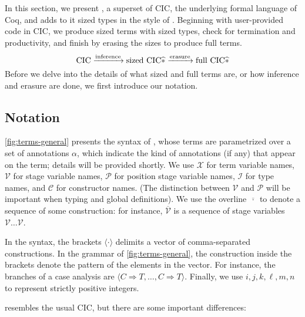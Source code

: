 \documentclass[nonacm,screen,10pt]{acmart}
\begin{document}
\section{\texorpdfstring{\lang}{CIC\^{}*}}\label{sec:typing}
In this section, we present \lang, a superset of CIC, the underlying formal language of Coq, and adds to it sized types in the style of \CIChat. Beginning with user-provided code in CIC, we produce sized \lang terms with sized types, check for termination and productivity, and finish by erasing the sizes to produce full \lang terms.
\begin{equation*}
    \text{CIC} \xrightarrow{\text{inference}} \text{sized CIC$\widehat{*}$} \xrightarrow{\text{erasure}} \text{full CIC$\widehat{*}$}
\end{equation*}
Before we delve into the details of what sized and full terms are, or how inference and erasure are done, we first introduce our notation.

\subsection{Notation}



\autoref{fig:terms-general} presents the syntax of \lang, whose terms are parametrized over a set of annotations $\alpha$, which indicate the kind of annotations (if any) that appear on the term; details will be provided shortly. We use $\mathcal{X}$ for term variable names, $\mathcal{V}$ for stage variable names, $\mathcal{P}$ for position stage variable names, $\mathcal{I}$ for \coinductive type names, and $\mathcal{C}$ for \coinductive constructor names. (The distinction between $\mathcal{V}$ and $\mathcal{P}$ will be important when typing \cofixpoints and global definitions). We use the overline $\overline{\,\cdot\,}$ to denote a sequence of some construction: for instance, $\overline{\mathcal{V}}$ is a sequence of stage variables $\mathcal{V} \dots 
\mathcal{V}$.

In the syntax, the brackets $\langle \cdot \rangle$ delimits a vector of comma-separated constructions. In the grammar of \autoref{fig:terms-general}, the construction inside the brackets denote the pattern of the elements in the vector. For instance, the branches of a case analysis are $\langle C \Rightarrow T, \dots, C \Rightarrow T \rangle$. Finally, we use $i, j, k, \ell, m, n$ to represent strictly positive integers.

\lang resembles the usual CIC, but there are some important differences:
\end{document}
